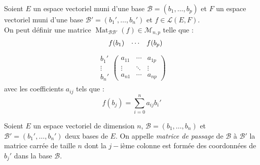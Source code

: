 \begin{definition}
    Soient $E$ un espace vectoriel muni d'une base $\mathcal{B} = (b_1, \ldots, b_p)$ et $F$ un espace vectoriel muni d'une base $\mathcal{B}' = (b_1', \ldots, b_n')$ et $f \in \mathcal{L}(E, F)$.
    \\
    On peut définir une matrice $\operatorname{Mat}_{\mathcal{B}\mathcal{B}'} (f) \in \mathcal{M}_{n,p}$ telle que :
    \begin{align*}
        \hspace{0.4cm}
        \begin{matrix}
            f(b_1) & \cdots & f(b_p) 
        \end{matrix}
    \end{align*}
    \vspace{-0.8cm}
    \begin{align*}
        \begin{matrix}
            b_1' \\
            \vdots \\ 
            b_n'
        \end{matrix}
        \begin{pmatrix}
            a_{11} & \cdots & a_{1p} \\
            \vdots & \ddots & \vdots \\ 
            a_{n1} & \cdots & a_{np}
        \end{pmatrix}
    \end{align*}
    avec les coefficients $a_{ij}$ tels que : 
    \[ f(b_j) = \sum_{i = 0}^n a_{ij} b_i' \]
\end{definition}

\begin{definition}
    Soient $E$ un espace vectoriel de dimension $n$, $\mathcal{B} = (b_1, \ldots, b_n)$ et $\mathcal{B}' = (b_1', \ldots, b_n')$ deux bases de $E$. On appelle \emph{matrice de passage} de $\mathcal{B}$ à $\mathcal{B}'$ la matrice carrée de taille $n$ dont la $j-$ième colonne est formée des coordonnées de $b_j'$ dans la base $\mathcal{B}$.
\end{definition}

